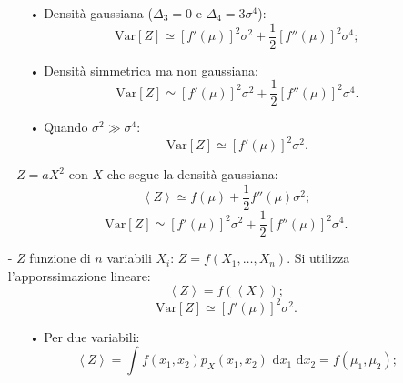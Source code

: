 \begin{itemize}
\begin{itemize}
\begin{equation}
\end{equation}
\item[•] Densità gaussiana (${ \Delta  }_{ 3 }=0$ e ${ \Delta  }_{ 4 }=3\sigma^4$):
\begin{equation}
\textrm{Var}\left[ Z \right] \simeq { \left[ f'\left( \mu  \right)  \right]  }^{ 2 }{ \sigma  }^{ 2 }+\frac { 1 }{ 2 } { \left[ f''\left( \mu  \right)  \right]  }^{ 2 }{ \sigma  }^{ 4 };
\end{equation}
\item[•] Densità simmetrica ma non gaussiana:
\begin{equation}
\textrm{Var}\left[ Z \right] \simeq { \left[ f'\left( \mu  \right)  \right]  }^{ 2 }{ \sigma  }^{ 2 }+\frac { 1 }{ 2 } { \left[ f''\left( \mu  \right)  \right]  }^{ 2 }{ \sigma  }^{ 4 }.
\end{equation}
\item[•] Quando $\sigma^2\gg\sigma^4$:
\begin{equation}
\textrm{Var}[Z]\simeq[f'(\mu)]^2\sigma^2.
\end{equation}
\end{itemize}
\item[-] $Z=aX^2$ con $X$ che segue la densità gaussiana:
\begin{equation}
\left< Z \right> \simeq f\left( \mu  \right) +\frac { 1 }{ 2 } { f'' }\left( \mu  \right) { \sigma  }^{ 2 };
\end{equation}
\begin{equation}
\textrm{Var}\left[ Z \right] \simeq { \left[ f'\left( \mu  \right)  \right]  }^{ 2 }{ \sigma  }^{ 2 }+\frac { 1 }{ 2 } { \left[ f''\left( \mu  \right)  \right]  }^{ 2 }{ \sigma  }^{ 4 }.
\end{equation}
\item[-] $Z$ funzione di $n$ variabili $X_i$: $Z=f(X_1,\dots,X_n)$.
Si utilizza l'apporssimazione lineare:
\begin{equation}
\left< Z \right> =f\left( \left< X \right>  \right);
\end{equation}
\begin{equation}
\textrm{Var}[Z]\simeq[f'(\mu)]^2\sigma^2.
\end{equation}
\begin{itemize}
\item[•] Per due variabili:
\begin{equation}
\left< Z \right> =\int { f\left( { x }_{ 1 },{ x }_{ 2 } \right) { p }_{ X }\left( { x }_{ 1 },{ x }_{ 2 } \right) \textrm{ d}{ x }_{ 1 }\textrm{ d}{ x }_{ 2 } } = f(\mu_1,\mu_2);
\end{equation}

\end{itemize}
\end{itemize}
